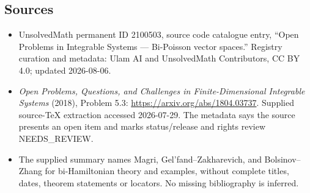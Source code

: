\documentclass[11pt]{article}
\begin{document}
\subsection{Sources}
\begin{itemize}
\item UnsolvedMath permanent ID 2100503, source code catalogue entry, ``Open Problems in Integrable Systems --- Bi-Poisson vector spaces.'' Registry curation and metadata: Ulam AI and UnsolvedMath Contributors, CC BY 4.0; updated 2026-08-06.
\item \emph{Open Problems, Questions, and Challenges in Finite-Dimensional Integrable Systems} (2018), Problem 5.3: \url{https://arxiv.org/abs/1804.03737}. Supplied source-TeX extraction accessed 2026-07-29. The metadata says the source presents an open item and marks status/release and rights review NEEDS\_REVIEW.
\item The supplied summary names Magri, Gel'fand--Zakharevich, and Bolsinov--Zhang for bi-Hamiltonian theory and examples, without complete titles, dates, theorem statements or locators. No missing bibliography is inferred.
\end{itemize}
\end{document}
